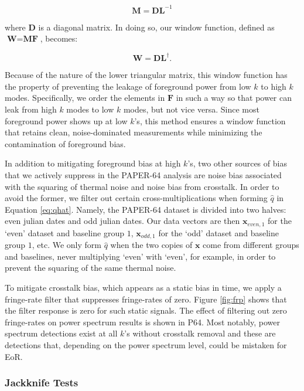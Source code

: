 \documentclass[preprint2,numberedappendix,tighten]{aastex6}  %
\begin{document}
\begin{equation}
\textbf{M} = \textbf{DL}^{-1}
\end{equation}

\noindent where $\textbf{D}$ is a diagonal matrix. In doing so, our window function, defined as $\textbf{W} = \textbf{MF}$, 
becomes:

\begin{equation}
\textbf{W} = \textbf{DL}^{\dagger}.
\end{equation}

\noindent Because of the nature of the lower triangular matrix, this window function has the property of preventing the leakage 
of foreground power from low $k$ to high $k$ modes. Specifically, we order the elements in $\textbf{F}$ in such a way so that 
power can leak from high $k$ modes to low $k$ modes, but not vice versa. Since most foreground power shows up at low 
$k$'s, this method ensures a window function that retains clean, noise-dominated measurements while minimizing the 
contamination of foreground bias.

In addition to mitigating foreground bias at high $k$'s, two other sources of bias that we actively suppress in the PAPER-64 
analysis are noise bias associated with the squaring of thermal noise and noise bias from crosstalk. In order to avoid the 
former, we filter out certain cross-multiplications when forming $\hat{q}$ in Equation \eqref{eq:qhat}. Namely, the PAPER-64 
dataset is divided into two halves: even julian dates and odd julian dates. Our data vectors are then $\textbf{x}_{even, 1}$ for 
the `even' dataset and baseline group $1$, $\textbf{x}_{odd, 1}$ for the `odd' dataset and baseline group $1$, etc. We only form 
$\hat{q}$ when the two copies of $\textbf{x}$ come from different groups and baselines, never multiplying `even' with `even', for 
example, in order to prevent the squaring of the same thermal noise.

To mitigate crosstalk bias, which appears as a static bias in time, we apply a fringe-rate filter that suppresses fringe-rates of 
zero. Figure \ref{fig:frp} shows that the filter response is zero for such static signals. The effect of filtering out zero fringe-rates 
on power spectrum results is shown in P64. Most notably, power spectrum detections exist at all $k$'s without crosstalk 
removal and these are detections that, depending on the power spectrum level, could be mistaken for EoR. 

\subsubsection{Jackknife Tests}
\end{document}
